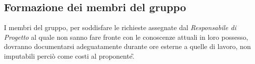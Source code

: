 \subsection{Formazione dei membri del gruppo}
I membri del gruppo, per soddisfare le richieste assegnate dal \textit{Responsabile di Progetto}
al quale non sanno fare fronte con le conoscenze attuali in loro possesso, dovranno
documentarsi adeguatamente durante ore esterne a quelle di lavoro, non imputabili
perciò come costi al proponente\G .

